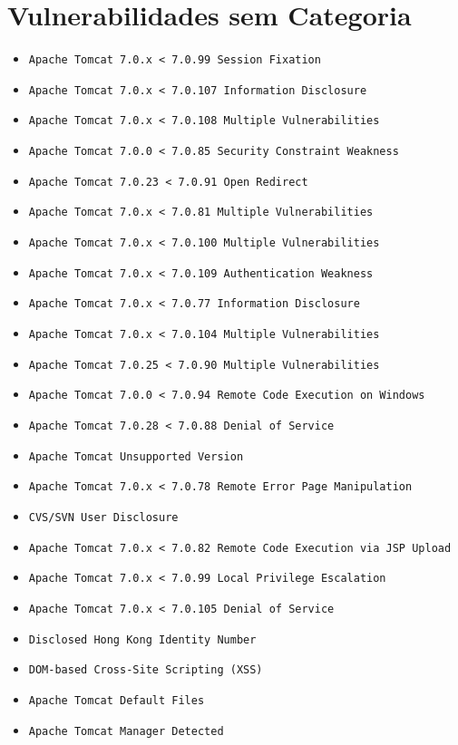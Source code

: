 \documentclass[a4paper,12pt]{article}
\begin{document}
\section{Vulnerabilidades sem Categoria}
\begin{itemize}
    \item \texttt{Apache Tomcat 7.0.x < 7.0.99 Session Fixation}
    \item \texttt{Apache Tomcat 7.0.x < 7.0.107 Information Disclosure}
    \item \texttt{Apache Tomcat 7.0.x < 7.0.108 Multiple Vulnerabilities}
    \item \texttt{Apache Tomcat 7.0.0 < 7.0.85 Security Constraint Weakness}
    \item \texttt{Apache Tomcat 7.0.23 < 7.0.91 Open Redirect}
    \item \texttt{Apache Tomcat 7.0.x < 7.0.81 Multiple Vulnerabilities}
    \item \texttt{Apache Tomcat 7.0.x < 7.0.100 Multiple Vulnerabilities}
    \item \texttt{Apache Tomcat 7.0.x < 7.0.109 Authentication Weakness}
    \item \texttt{Apache Tomcat 7.0.x < 7.0.77 Information Disclosure}
    \item \texttt{Apache Tomcat 7.0.x < 7.0.104 Multiple Vulnerabilities}
    \item \texttt{Apache Tomcat 7.0.25 < 7.0.90 Multiple Vulnerabilities}
    \item \texttt{Apache Tomcat 7.0.0 < 7.0.94 Remote Code Execution on Windows}
    \item \texttt{Apache Tomcat 7.0.28 < 7.0.88 Denial of Service}
    \item \texttt{Apache Tomcat Unsupported Version}
    \item \texttt{Apache Tomcat 7.0.x < 7.0.78 Remote Error Page Manipulation}
    \item \texttt{CVS/SVN User Disclosure}
    \item \texttt{Apache Tomcat 7.0.x < 7.0.82 Remote Code Execution via JSP Upload}
    \item \texttt{Apache Tomcat 7.0.x < 7.0.99 Local Privilege Escalation}
    \item \texttt{Apache Tomcat 7.0.x < 7.0.105 Denial of Service}
    \item \texttt{Disclosed Hong Kong Identity Number}
    \item \texttt{DOM-based Cross-Site Scripting (XSS)}
    \item \texttt{Apache Tomcat Default Files}
    \item \texttt{Apache Tomcat Manager Detected}
\end{itemize}
\end{document}
